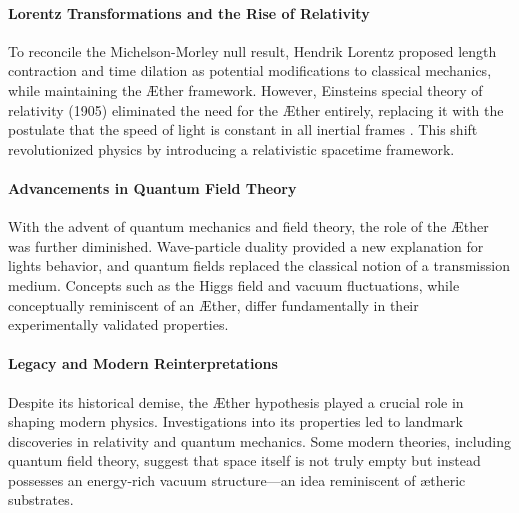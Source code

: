     \paragraph*{Lorentz Transformations and the Rise of Relativity}
    To reconcile the Michelson-Morley null result, Hendrik Lorentz proposed length contraction and time dilation as potential modifications to classical mechanics, while maintaining the Æther framework. However, Einstein\rqs s special theory of relativity (1905) eliminated the need for the Æther entirely, replacing it with the postulate that the speed of light is constant in all inertial frames \cite{einstein1905}. This shift revolutionized physics by introducing a relativistic spacetime framework.

    \paragraph*{Advancements in Quantum Field Theory}
    With the advent of quantum mechanics and field theory, the role of the Æther was further diminished. Wave-particle duality provided a new explanation for light\rqs s behavior, and quantum fields replaced the classical notion of a transmission medium. Concepts such as the Higgs field \cite{higgs1964} and vacuum fluctuations, while conceptually reminiscent of an Æther, differ fundamentally in their experimentally validated properties.

    \paragraph*{Legacy and Modern Reinterpretations}
    Despite its historical demise, the Æther hypothesis played a crucial role in shaping modern physics. Investigations into its properties led to landmark discoveries in relativity and quantum mechanics. Some modern theories, including quantum field theory, suggest that space itself is not truly empty but instead possesses an energy-rich vacuum structure—an idea reminiscent of ætheric substrates.